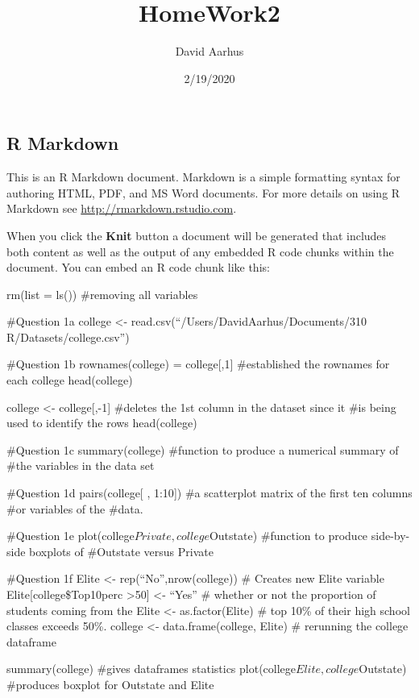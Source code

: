 \documentclass[]{article}
\title{HomeWork2}
\author{David Aarhus}
\date{2/19/2020}
\begin{document}
\maketitle

\hypertarget{r-markdown}{%
\subsection{R Markdown}\label{r-markdown}}

This is an R Markdown document. Markdown is a simple formatting syntax
for authoring HTML, PDF, and MS Word documents. For more details on
using R Markdown see \url{http://rmarkdown.rstudio.com}.

When you click the \textbf{Knit} button a document will be generated
that includes both content as well as the output of any embedded R code
chunks within the document. You can embed an R code chunk like this:

rm(list = ls()) \#removing all variables

\#Question 1a college \textless{}-
read.csv(``/Users/DavidAarhus/Documents/310 R/Datasets/college.csv'')

\#Question 1b rownames(college) = college{[},1{]} \#established the
rownames for each college head(college)

college \textless{}- college{[},-1{]} \#deletes the 1st column in the
dataset since it \#is being used to identify the rows head(college)

\#Question 1c summary(college) \#function to produce a numerical summary
of \#the variables in the data set

\#Question 1d pairs(college{[} , 1:10{]}) \#a scatterplot matrix of the
first ten columns \#or variables of the \#data.

\#Question 1e plot(college\(Private, college\)Outstate) \#function to
produce side-by-side boxplots of \#Outstate versus Private

\#Question 1f Elite \textless{}- rep(``No'',nrow(college)) \# Creates
new Elite variable Elite{[}college\$Top10perc \textgreater{}50{]}
\textless{}- ``Yes'' \# whether or not the proportion of students coming
from the Elite \textless{}- as.factor(Elite) \# top 10\% of their high
school classes exceeds 50\%. college \textless{}- data.frame(college,
Elite) \# rerunning the college dataframe

summary(college) \#gives dataframes statistics
plot(college\(Elite, college\)Outstate) \#produces boxplot for Outstate
and Elite
\end{document}
